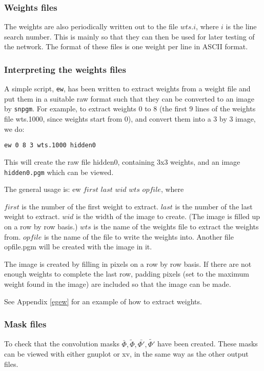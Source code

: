 \documentclass[a4paper]{article}
\newcommand{\lkernel}{\bar{\Phi}}
\newcommand{\skernel}{\tilde{\Phi}}
\newcommand{\dskernel}{\tilde{\Phi'}}
\newcommand{\dlkernel}{\bar{\Phi'}}
\begin{document}
\subsubsection{Weights files}

The weights are also periodically written out to the file $wts.i$,
where $i$ is the line search number.  This is mainly so that they can
then be used for later testing of the network.  The format of these
files is one weight per line in ASCII format.

\subsubsection*{Interpreting the weights files}

A simple script, \texttt{ew}, has been written to extract weights from
a weight file and put them in a suitable raw format such that they can
be converted to an image by \texttt{snpgm}.  
For example, to extract weights 0 to 8 (the first 9 lines of the
weights file wts.1000, since weights start from 0), and convert them into a 3
by 3 image, we do:

\texttt{ew 0 8 3 wts.1000 hidden0}

This will create the raw file hidden0, containing 3x3 weights, and an
image \texttt{hidden0.pgm} which can be viewed.

The general usage is: {ew $first$ $last$ $wid$ $wts$ $opfile$}, where

$first$ is the number of the first weight to extract.  $last$ is the
number of the last weight to extract.  $wid$ is the width of the image
to create. (The image is filled up on a row by row basis.)  $wts$ is
the name of the weights file to extract the weights from.  $opfile$ is
the name of the file to write the weights into.  Another file
opfile.pgm will be created with the image in it.

The image is created by filling in pixels on a row by row basis.  If
there are not enough weights to complete the last row, padding pixels
(set to the maximum weight found in the image) are included so that
the image can be made.

See Appendix \ref{egew} for an example of how to extract weights.

\subsubsection{Mask files}

To check that the convolution masks  $\lkernel, \skernel, \dlkernel,
\dskernel$ have been created.  These masks can
be viewed with either gnuplot or xv, in the same way as the other
output files.
\end{document}
